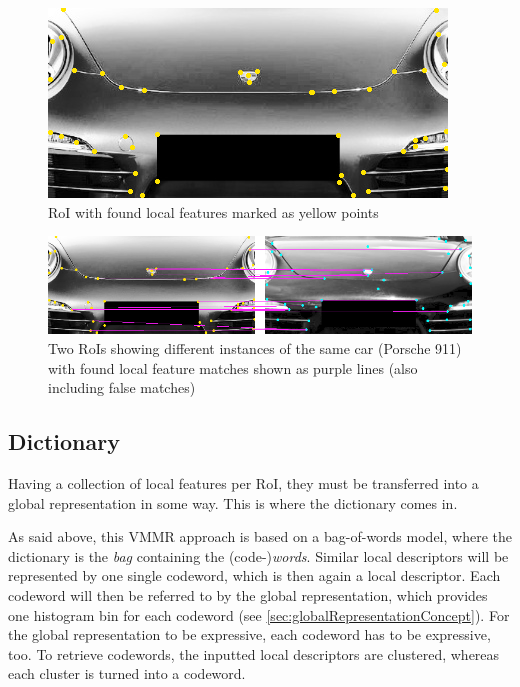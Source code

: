 \begin{figure}[btph]
  \centering
        \includegraphics[width=.35\linewidth]{gfx/local_features_porsche}
        \caption{RoI with found local features marked as yellow points}
        \label{fig:localFeaturesExample}
\end{figure}
\begin{figure}[btph]
  \centering
        \includegraphics[width=.65\linewidth]{gfx/local_features_porsche_matching}
        \caption{Two RoIs showing different instances of the same car (Porsche 911) with found local feature matches shown as purple lines (also including false matches)}
        \label{fig:localFeaturesMatchingExample}
\end{figure}

\subsection{Dictionary}\label{sec:dictionaryConcept}
Having a collection of local features per RoI, they must be transferred into a global representation in some way. This is where the dictionary comes in.

As said above, this VMMR approach is based on a bag-of-words model, where the dictionary is the \emph{bag} containing the (code-)\emph{words}. Similar local descriptors will be represented by one single codeword, which is then again a local descriptor. Each codeword will then be referred to by the global representation, which provides one histogram bin for each codeword (see \ref{sec:globalRepresentationConcept}). For the global representation to be expressive, each codeword has to be expressive, too. To retrieve codewords, the inputted local descriptors are clustered, whereas each cluster is turned into a codeword.

